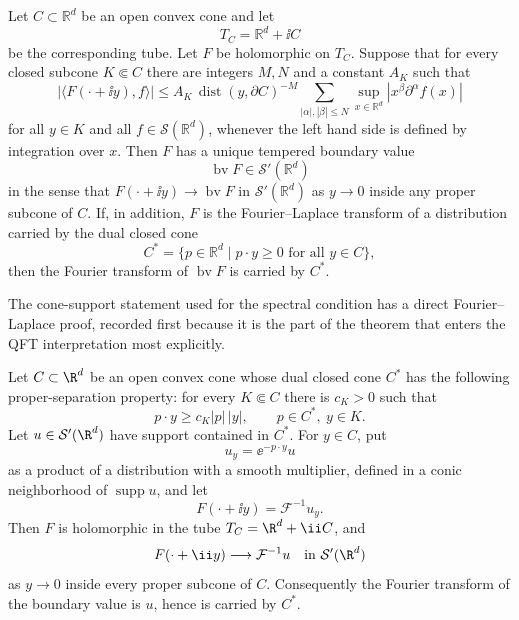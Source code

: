 \begin{theorem}
\label{qthm:polynomial-tube-bounds-boundary-values}
Let \(C\subset\mathbb R^d\) be an open convex cone and let
\[
  T_C=\mathbb R^d+\ii C
\]
be the corresponding tube.  Let \(F\) be holomorphic on \(T_C\).  Suppose that
for every closed subcone \(K\Subset C\) there are integers \(M,N\) and a
constant \(A_K\) such that
\begin{equation}
  |\langle F(\cdot+\ii y),f\rangle|
  \le
  A_K\,\operatorname{dist}(y,\partial C)^{-M}
  \sum_{|\alpha|,|\beta|\le N}
    \sup_{x\in\mathbb R^d}|x^\beta\partial^\alpha f(x)|
  \label{eq:polynomial-tube-bound-abstract}
\end{equation}
for all \(y\in K\) and all \(f\in\mathcal S(\mathbb R^d)\), whenever the
left hand side is defined by integration over \(x\).  Then \(F\) has a unique
tempered boundary value
\[
  \operatorname{bv}F\in\mathcal S'(\mathbb R^d)
\]
in the sense that \(F(\cdot+\ii y)\to\operatorname{bv}F\) in
\(\mathcal S'(\mathbb R^d)\) as \(y\to0\) inside any proper subcone of \(C\).
If, in addition, \(F\) is the Fourier--Laplace transform of a distribution
carried by the dual closed cone
\[
  C^*=\{p\in\mathbb R^d\mid p\cdot y\ge0\text{ for all }y\in C\},
\]
then the Fourier transform of
\(\operatorname{bv}F\) is carried by \(C^*\).
\end{theorem}

The cone-support statement used for the spectral condition has a direct
Fourier--Laplace proof, recorded first because it is the part of the theorem
that enters the QFT interpretation most explicitly.

\begin{lemma}
\label{lem:fourier-laplace-boundary-cone-support}
Let \(C\subset\R^d\) be an open convex cone whose dual closed cone \(C^*\) has
the following proper-separation property: for every \(K\Subset C\) there is
\(c_K>0\) such that
\begin{equation}
  p\cdot y\ge c_K |p|\,|y|,
  \qquad p\in C^*,\ y\in K .
  \label{eq:proper-dual-cone-separation}
\end{equation}
Let \(u\in\mathcal S'(\R^d)\) have support contained in \(C^*\).  For
\(y\in C\), put
\[
  u_y=\ee^{-p\cdot y}u
\]
as a product of a distribution with a smooth multiplier, defined in a conic
neighborhood of \(\operatorname{supp}u\), and let
\[
  F(\cdot+\ii y)=\mathcal F^{-1}u_y .
\]
Then \(F\) is holomorphic in the tube \(T_C=\R^d+\ii C\), and
\[
  F(\cdot+\ii y)\longrightarrow \mathcal F^{-1}u
  \quad\text{in }\mathcal S'(\R^d)
\]
as \(y\to0\) inside every proper subcone of \(C\).  Consequently the Fourier
transform of the boundary value is \(u\), hence is carried by \(C^*\).
\end{lemma}

